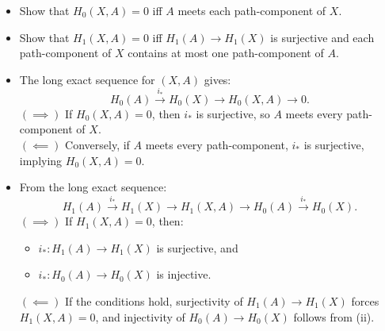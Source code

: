 \documentclass[12pt]{article}
\begin{document}
\begin{statement}
    \begin{itemize}
        \item Show that $H_0(X,A) = 0$ iff $A$ meets each path-component of $X$. 
        \item Show that $H_1(X,A) = 0$ iff $H_1(A) \to H_1(X)$ is surjective and each path-component of $X$ contains at most one path-component of $A$. 
    \end{itemize}
\end{statement}
\begin{newproof}
\begin{itemize}
    \item The long exact sequence for \((X,A)\) gives:
    \[
    H_0(A) \xrightarrow{i_*} H_0(X) \to H_0(X,A) \to 0.
    \]
    $(\implies)$ If \( H_0(X,A) = 0 \), then \( i_* \) is surjective, so \( A \) meets every path-component of \( X \). \\
    $(\impliedby)$ Conversely, if \( A \) meets every path-component, \( i_* \) is surjective, implying \( H_0(X,A) = 0 \).

    \item From the long exact sequence:
    \[
    H_1(A) \xrightarrow{i_*} H_1(X) \to H_1(X,A) \to H_0(A) \xrightarrow{i_*} H_0(X).
    \]
    $(\implies)$ If \( H_1(X,A) = 0 \), then:
    \begin{itemize}
        \item \( i_*: H_1(A) \to H_1(X) \) is surjective, and
        \item \( i_*: H_0(A) \to H_0(X) \) is injective.
    \end{itemize}
    $(\impliedby)$ If the conditions hold, surjectivity of \( H_1(A) \to H_1(X) \) forces \( H_1(X,A) = 0 \), and injectivity of \( H_0(A) \to H_0(X) \) follows from (ii).
\end{itemize}

\end{newproof}
\end{document}
